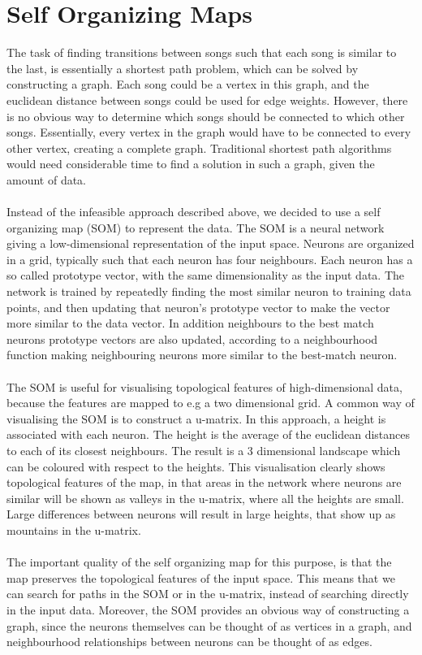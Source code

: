 \section{Self Organizing Maps} %
\label{sec:self_organizing_maps}
The task of finding transitions between songs such that each song is similar to the last, is essentially a shortest path problem, which can be solved by constructing a graph. Each song could be a vertex in this graph, and the euclidean distance between songs could be used for edge weights. However, there is no obvious way to determine which songs should be connected to which other songs. Essentially, every vertex in the graph would have to be connected to every other vertex, creating a complete graph. Traditional shortest path algorithms would need considerable time to find a solution in such a graph, given the amount of data.
\\\\
Instead of the infeasible approach described above, we decided to use a self organizing map (SOM) to represent the data. The SOM is a neural network giving a low-dimensional representation of the input space. Neurons are organized in a grid, typically such that each neuron has four neighbours. Each neuron has a so called prototype vector, with the same dimensionality as the input data. The network is trained by repeatedly finding the most similar neuron to training data points, and then updating that neuron's prototype vector to make the vector more similar to the data vector. In addition neighbours to the best match neurons prototype vectors are also updated, according to a neighbourhood function making neighbouring neurons more similar to the best-match neuron.
\\\\
The SOM is useful for visualising topological features of high-dimensional data, because the features are mapped to e.g a two dimensional grid. A common way of visualising the SOM is to construct a u-matrix. In this approach, a height is associated with each neuron. The height is the average of the euclidean distances to each of its closest neighbours. The result is a 3 dimensional landscape which can be coloured with respect to the heights. This visualisation clearly shows topological features of the map, in that areas in the network where neurons are similar will be shown as valleys in the u-matrix, where all the heights are small. Large differences between neurons will result in large heights, that show up as mountains in the u-matrix.
\\\\
The important quality of the self organizing map for this purpose, is that the map preserves the topological features of the input space. This means that we can search for paths in the SOM or in the u-matrix, instead of searching directly in the input data. Moreover, the SOM provides an obvious way of constructing a graph, since the neurons themselves can be thought of as vertices in a graph, and neighbourhood relationships between neurons can be thought of as edges.

